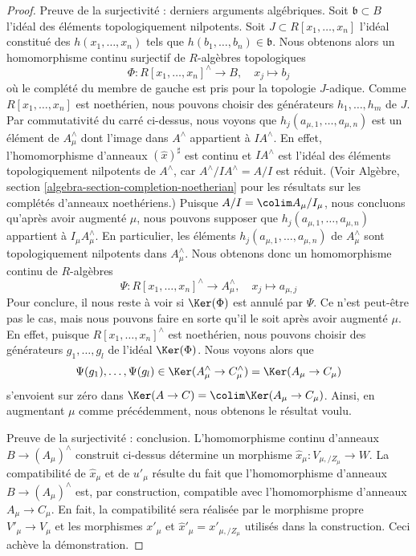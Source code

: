 \begin{proof}
\medskip\noindent
Preuve de la surjectivité : derniers arguments algébriques.
Soit $\mathfrak b \subset B$ l'idéal des éléments topologiquement
nilpotents. Soit $J \subset R[x_1, \ldots, x_n]$ l'idéal
constitué des $h(x_1, \ldots, x_n)$ tels que
$h(b_1, \ldots, b_n) \in \mathfrak b$. Nous obtenons alors un homomorphisme continu
surjectif de $R$-algèbres topologiques
$$
\Phi : R[x_1, \ldots, x_n]^\wedge \longrightarrow B,\quad
x_j \longmapsto b_j
$$
où le complété du membre de gauche est pris pour la topologie $J$-adique.
Comme $R[x_1, \ldots, x_n]$ est noethérien, nous pouvons choisir
des générateurs $h_1, \ldots, h_m$ de $J$. Par commutativité
du carré ci-dessus, nous voyons que $h_j(a_{\mu, 1}, \ldots, a_{\mu, n})$ est
un élément de $A_\mu^\wedge$ dont l'image dans $A^\wedge$ appartient
à $IA^\wedge$. En effet, l'homomorphisme d'anneaux $(\hat x)^\sharp$ est continu
et $IA^\wedge$ est l'idéal des éléments topologiquement nilpotents
de $A^\wedge$, car $A^\wedge/IA^\wedge = A/I$ est réduit.
(Voir Algèbre, section \ref{algebra-section-completion-noetherian}
pour les résultats sur les complétés d'anneaux noethériens.)
Puisque $A/I = \colim A_\mu/I_\mu$, nous concluons qu'après avoir augmenté
$\mu$, nous pouvons supposer que $h_j(a_{\mu, 1}, \ldots, a_{\mu, n})$ appartient à
$I_\mu A_\mu^\wedge$. En particulier, les éléments
$h_j(a_{\mu, 1}, \ldots, a_{\mu, n})$ de $A_\mu^\wedge$
sont topologiquement nilpotents dans $A_\mu^\wedge$.
Nous obtenons donc un homomorphisme continu de $R$-algèbres
$$
\Psi : R[x_1, \ldots, x_n]^\wedge \longrightarrow A_\mu^\wedge,\quad
x_j \longmapsto a_{\mu, j}
$$
Pour conclure, il nous reste à voir si $\Ker(\Phi)$ est
annulé par $\Psi$. Ce n'est peut-être pas le cas, mais nous pouvons faire en sorte
qu'il le soit après avoir augmenté $\mu$. En effet, puisque
$R[x_1, \ldots, x_n]^\wedge$ est noethérien,
nous pouvons choisir des générateurs $g_1, \ldots, g_l$ de l'idéal
$\Ker(\Phi)$. Nous voyons alors que
$$
\Psi(g_1), \ldots, \Psi(g_l) \in
\Ker(A_\mu^\wedge \to C_\mu^\wedge) = \Ker(A_\mu \to C_\mu)
$$
s'envoient sur zéro dans $\Ker(A \to C) = \colim \Ker(A_\mu \to C_\mu)$.
Ainsi, en augmentant $\mu$ comme précédemment, nous obtenons le résultat voulu.

\medskip\noindent
Preuve de la surjectivité : conclusion. L'homomorphisme continu d'anneaux
$B \to (A_\mu)^\wedge$ construit ci-dessus détermine un morphisme
$\hat x_\mu : V_{\mu, /Z_\mu} \to W$.
La compatibilité de $\hat x_\mu$ et de $u'_\mu$ résulte
du fait que l'homomorphisme d'anneaux $B \to (A_\mu)^\wedge$
est, par construction, compatible avec l'homomorphisme d'anneaux $A_\mu \to C_\mu$.
En fait, la compatibilité sera réalisée par le morphisme propre
$V'_\mu \to V_\mu$ et les morphismes
$x'_\mu$ et $\hat x'_\mu = x'_{\mu, /Z_\mu}$ utilisés dans
la construction. Ceci achève la démonstration.
\end{proof}

